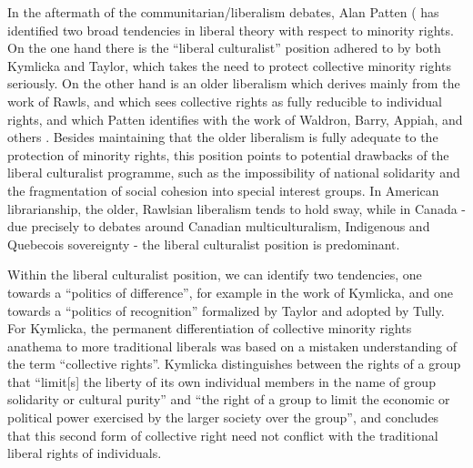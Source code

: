 \documentclass[12pt,oneside]{memoir}
\begin{document}
In the aftermath of the communitarian/liberalism debates, Alan Patten (\cite{patten-2014} has identified two broad tendencies in liberal theory with respect to minority rights. On the one hand there is the ``liberal culturalist'' position adhered to by both Kymlicka and Taylor, which takes the need to protect collective minority rights seriously. On the other hand is an older liberalism which derives mainly from the work of Rawls, and which sees collective rights as fully reducible to individual rights, and which Patten identifies with the work of Waldron, Barry, Appiah, and others \cite[4]{patten-2014}. Besides maintaining that the older liberalism is fully adequate to the protection of minority rights, this position points to potential drawbacks of the liberal culturalist programme, such as the impossibility of national solidarity and the fragmentation of social cohesion into special interest groups. In American librarianship, the older, Rawlsian liberalism tends to hold sway, while in Canada - due precisely to debates around Canadian multiculturalism, Indigenous and Quebecois sovereignty - the liberal culturalist position is predominant.

Within the liberal culturalist position, we can identify two tendencies, one towards a ``politics of difference'', for example in the work of Kymlicka, and one towards a ``politics of recognition'' formalized by Taylor and adopted by Tully. For Kymlicka, the permanent differentiation of collective minority rights anathema to more traditional liberals was based on a mistaken understanding of the term ``collective rights''. Kymlicka distinguishes between the rights of a group that ``limit[s] the liberty of its own individual members in the name of group solidarity or cultural purity'' and ``the right of a group to limit the economic or political power exercised by the larger society over the group'', and concludes that this second form of collective right need not conflict with the traditional liberal rights of individuals.
\end{document}
